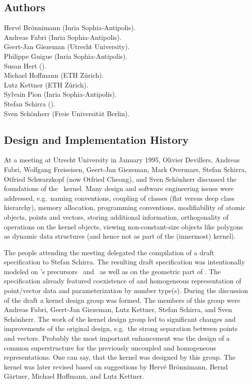 \subsection*{Authors}

Herv\'e Br\"onnimann ({\sc Inria} Sophia-Antipolis). \\
Andreas Fabri ({\sc Inria} Sophia-Antipolis).\\
Geert-Jan Giezeman (Utrecht University).\\
Philippe Guigue ({\sc Inria} Sophia-Antipolis).\\
Susan Hert ().\\
Michael Hoffmann (ETH Z\"urich).\\
Lutz Kettner (ETH Z\"urich).\\
Sylvain Pion ({\sc Inria} Sophia-Antipolis). \\
Stefan Schirra ().\\
Sven Sch\"onherr (Freie Universit{\"a}t Berlin).

\subsection*{Design and Implementation History}

At a meeting at Utrecht University in January 1995,
Olivier Devillers, Andreas Fabri, Wolfgang Freiseisen,
Geert-Jan Giezeman, Mark Overmars, Stefan Schirra, Otfried Schwarzkopf
(now Otfried Cheong), and Sven Sch\"onherr
discussed the foundations of the \cgal\ kernel.
Many design and software engineering issues were addressed, 
e.g.\ naming conventions, coupling of classes 
(flat versus deep class hierarchy), 
memory allocation, programming conventions, modifiability of 
atomic objects, points and vectors, storing additional information, 
orthogonality of operations on the kernel objects,
viewing non-constant-size objects like polygons as 
dynamic data structures (and hence not as part of the (innermost) kernel).

The people attending the meeting delegated the compilation of 
a draft specification to Stefan Schirra.
The resulting draft specification was intentionally modeled on \cgal's 
precursors \protocgal\ and \plageo\ as well as on the geometric part of \leda.
The specification already featured coexistence of 
 and 
homogeneous representation of point/vector data and parameterization 
by number type(s).
During the discussion of the draft a kernel design group was formed. 
The members of this group were Andreas Fabri, Geert-Jan Giezeman,
Lutz Kettner, Stefan Schirra, and Sven Sch\"onherr.
The work of the kernel design group led to significant changes and
improvements of the original design, e.g.\ the strong separation between
points and vectors. Probably the most important enhancement was the design 
of a common superstructure for the previously uncoupled 
 and
homogeneous representations. One can say, that the kernel was designed
by this group.
The kernel was later revised based on suggestions by Herv\'e Br\"onnimann,
Bernd G\"artner, Michael Hoffmann, and Lutz Kettner.

